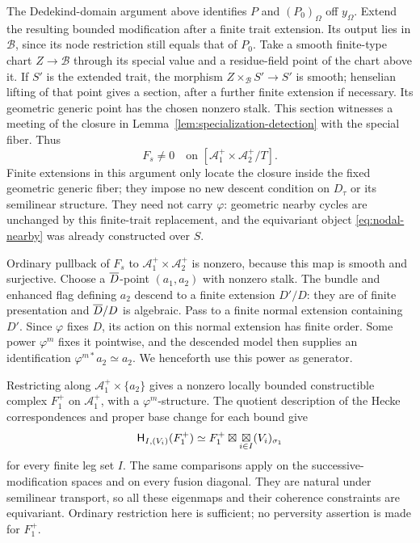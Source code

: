 The Dedekind-domain argument above identifies $P$ and $(P_0)_\Omega$
off $y_\Omega$.  Extend the resulting bounded modification after a
finite trait extension.  Its output lies in $\mathcal B$, since its
node restriction still equals that of $P_0$.  Take a smooth
finite-type chart $Z\to\mathcal B$ through its special value and a
residue-field point of the chart above it.  If $S'$ is the extended
trait, the morphism $Z\times_{\mathcal B}S'\to S'$ is smooth;
henselian lifting of that point gives a section, after a further
finite extension if necessary.  Its geometric generic
point has the chosen nonzero stalk.  This section witnesses a
meeting of the closure in Lemma~\ref{lem:specialization-detection}
with the special fiber.  Thus
\begin{equation}\label{eq:nodal-nonzero}
 F_s\ne0\quad\text{on }[\mathcal A_1^+\times\mathcal A_2^+/T].
\end{equation}
Finite extensions in this argument only locate the closure inside
the fixed geometric generic fiber; they impose no new descent
condition on $D_\tau$ or its semilinear structure.  They need not
carry $\varphi$: geometric nearby cycles are unchanged by this
finite-trait replacement, and the equivariant object
\eqref{eq:nodal-nearby} was already constructed over $S$.

Ordinary pullback of $F_s$ to
$\mathcal A_1^+\times\mathcal A_2^+$ is nonzero, because this map is
smooth and surjective.  Choose a $\overline D$-point $(a_1,a_2)$ with
nonzero stalk.  The bundle and enhanced flag defining $a_2$ descend
to a finite extension $D'/D$: they are of finite presentation and
$\overline D/D$ is algebraic.  Pass to a finite normal extension
containing $D'$.  Since $\varphi$ fixes $D$, its action on this
normal extension has finite order.  Some power $\varphi^m$ fixes
it pointwise, and the descended model then supplies an
identification $\varphi^{m*}a_2\simeq a_2$.  We henceforth use this
power as generator.

Restricting along $\mathcal A_1^+\times\{a_2\}$ gives a nonzero
locally bounded constructible complex $F_1^+$ on $\mathcal A_1^+$,
with a $\varphi^m$-structure.  The quotient description of the Hecke
correspondences and proper base change for each bound give
\begin{equation}\label{eq:nodal-enhanced-eigen}
 \mathsf H_{I,(V_i)}(F_1^+)
   \simeq F_1^+\boxtimes
                 \mathop{\boxtimes}_{i\in I}(V_i)_{\sigma_1}
\end{equation}
for every finite leg set $I$.  The same comparisons apply on the
successive-modification spaces and on every fusion diagonal.
They are natural under semilinear transport, so all these
eigenmaps and their coherence constraints are equivariant.
Ordinary restriction here is sufficient; no perversity assertion
is made for $F_1^+$.

